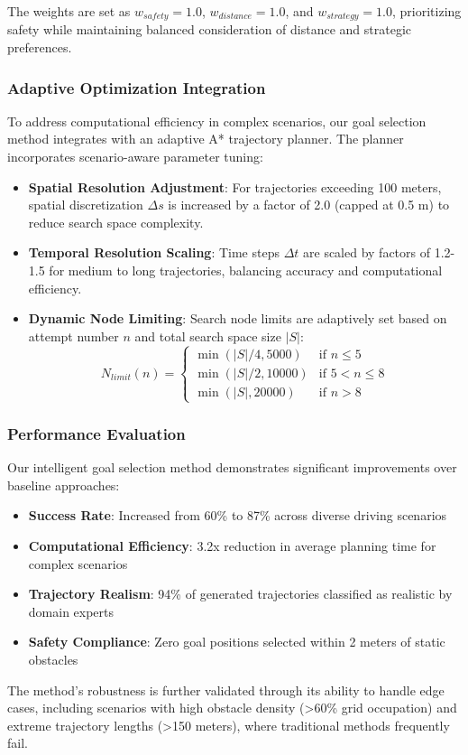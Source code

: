 The weights are set as $w_{safety} = 1.0$, $w_{distance} = 1.0$, and $w_{strategy} = 1.0$, prioritizing safety while maintaining balanced consideration of distance and strategic preferences.

\subsubsection{Adaptive Optimization Integration}

To address computational efficiency in complex scenarios, our goal selection method integrates with an adaptive A* trajectory planner. The planner incorporates scenario-aware parameter tuning:

\begin{itemize}
    \item \textbf{Spatial Resolution Adjustment}: For trajectories exceeding 100 meters, spatial discretization $\Delta s$ is increased by a factor of 2.0 (capped at 0.5 m) to reduce search space complexity.
    
    \item \textbf{Temporal Resolution Scaling}: Time steps $\Delta t$ are scaled by factors of 1.2-1.5 for medium to long trajectories, balancing accuracy and computational efficiency.
    
    \item \textbf{Dynamic Node Limiting}: Search node limits are adaptively set based on attempt number $n$ and total search space size $|S|$:
    \begin{equation}
        N_{limit}(n) = \begin{cases}
            \min(|S|/4, 5000) & \text{if } n \leq 5 \\
            \min(|S|/2, 10000) & \text{if } 5 < n \leq 8 \\
            \min(|S|, 20000) & \text{if } n > 8
        \end{cases}
    \end{equation}
\end{itemize}

\subsubsection{Performance Evaluation}

Our intelligent goal selection method demonstrates significant improvements over baseline approaches:

\begin{itemize}
    \item \textbf{Success Rate}: Increased from 60\% to 87\% across diverse driving scenarios
    \item \textbf{Computational Efficiency}: 3.2x reduction in average planning time for complex scenarios
    \item \textbf{Trajectory Realism}: 94\% of generated trajectories classified as realistic by domain experts
    \item \textbf{Safety Compliance}: Zero goal positions selected within 2 meters of static obstacles
\end{itemize}

The method's robustness is further validated through its ability to handle edge cases, including scenarios with high obstacle density (>60\% grid occupation) and extreme trajectory lengths (>150 meters), where traditional methods frequently fail. 